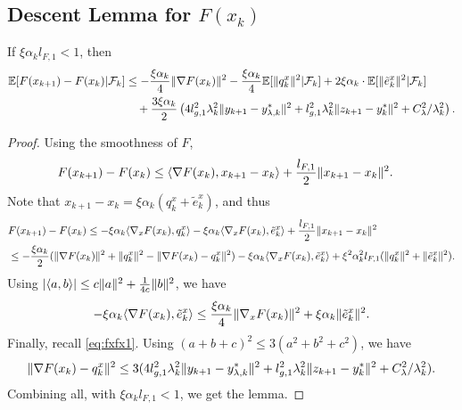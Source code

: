 \subsection{Descent Lemma for $F(x_{k})$}
\begin{lemma}
    If $\xi \alpha_k l_{F,1} < 1$, then
    \begin{align*}
        \mathbb{E}[F(x_{k+1}) - F(x_k) | \mathcal{F}_k] &\le -\frac{\xi \alpha_k}{4} \|\nabla F(x_k)\|^2 - \frac{\xi \alpha_k}{4} \mathbb{E}[\|q_k^x\|^2| \mathcal{F}_k] + 2 \xi \alpha_k \cdot \mathbb{E}[\|\tilde{e}_k^x\|^2 | \mathcal{F}_k] \\
        &\quad + \frac{3 \xi \alpha_k}{2} \left(4 l_{g,1}^2 \lambda_k^2 \|y_{k+1} - y_{\lambda,k}^*\|^2 + l_{g,1}^2 \lambda_k^2 \|z_{k+1} - y_k^*\|^2 + C_\lambda^2 / \lambda_k^2 \right). 
    \end{align*}
\end{lemma}
\begin{proof}
    Using the smoothness of $F$, 
    \begin{align*}
        F(x_{k+1}) - F(x_k) &\le \langle \nabla F(x_k), x_{k+1} - x_k \rangle + \frac{l_{F,1}}{2} \|x_{k+1} - x_k\|^2 .
    \end{align*}
    Note that $x_{k+1} - x_k = \xi \alpha_k (q_k^x + \tilde{e}_k^x)$, and thus 
    \begin{align*}
        &F(x_{k+1}) - F(x_k) \le -\xi \alpha_k \langle \nabla_x F(x_k), q_k^x \rangle -\xi \alpha_k \langle \nabla_x F(x_k), \tilde{e}_k^x \rangle + \frac{l_{F,1}}{2} \|x_{k+1} - x_k\|^2  \\
        &\le -\frac{\xi \alpha_k}{2} (\|\nabla F(x_k)\|^2 + \|q_k^x\|^2 - \| \nabla F(x_k) - q_k^x \|^2) -\xi \alpha_k \langle \nabla_x F(x_k), \tilde{e}_k^x \rangle + \xi^2\alpha_k^2 l_{F,1} (\|q_k^x\|^2 + \| \tilde{e}_k^x\|^2).
    \end{align*}
    Using $|\langle a, b \rangle| \le c\|a\|^2 + \frac{1}{4c}\|b\|^2$, we have
    \begin{align*}
        -\xi\alpha_k \langle \nabla F(x_k), \tilde{e}_k^x \rangle \le \frac{\xi \alpha_k}{4} \|\nabla_x F(x_k)\|^2 + \xi\alpha_k \|\tilde{e}_k^x\|^2.
    \end{align*}
    Finally, recall \eqref{eq:fxfx1}. Using $(a+b+c)^2 \le 3(a^2 + b^2 + c^2)$, we have
    \begin{align*}
        \|\nabla F(x_k) - q_k^x\|^2 \le 3(4l_{g,1}^2\lambda_k^2 \|y_{k+1} - y_{\lambda,k}^*\|^2 + l_{g,1}^2 \lambda_k^2 \|z_{k+1} - y_k^*\|^2 + C_\lambda^2 / \lambda_k^2). 
    \end{align*}
    Combining all, with $\xi \alpha_k l_{F,1} < 1$, we get the lemma. 
\end{proof}



